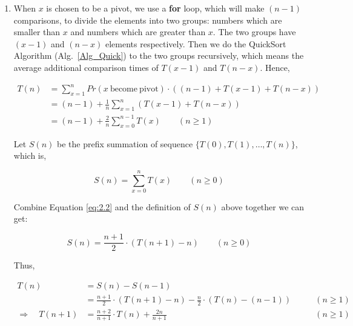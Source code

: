 \documentclass[12pt,a4paper]{article}
\makeatletter
\newtheorem*{solution}{Solution}
\theoremstyle{definition}
\renewenvironment{solution}[1][Solution] {\par\pushQED{\qed}\normalfont\topsep6\p@\@plus6\p@\relax\trivlist\item[\hskip\labelsep\bfseries#1\@addpunct{.}]\ignorespaces}{\popQED\endtrivlist\@endpefalse} \makeatother
\makeatother
\begin{document}
\begin{enumerate}
\begin{solution}
        When $x$ is chosen to be a pivot, we use a \textbf{for} loop, which will make $(n-1)$ comparisons, to divide the elements into two groups: numbers which are smaller than $x$ and numbers which are greater than $x$. The two groups have $(x - 1)$ and $(n - x)$ elements respectively. Then we do the QuickSort Algorithm (Alg.~\ref{Alg_Quick}) to the two groups recursively, which means the average additional comparison times of $T(x-1)$ and $T(n-x)$. Hence,

        \begin{equation}
        \begin{aligned}
            T(n) &= \sum_{x=1}^n Pr(x \mathrm{\ become\ pivot}) \cdot \left((n-1) + T(x-1) + T(n-x)\right) \\
                 &= (n-1) + \frac{1}{n} \sum_{x=1}^n \left(T(x-1) + T(n-x)\right) \\
                 &= (n-1) + \frac{2}{n} \sum_{x=0}^{n-1} T(x) \quad \quad (n \geq 1)
        \end{aligned}
        \label{eq:2.2}
        \end{equation}

        Let $S(n)$ be the prefix summation of sequence $\{T(0), T(1), \dots, T(n)\}$, which is,

        \begin{displaymath}
            S(n) = \sum_{x=0}^{n} T(x) \quad \quad  (n \geq 0)
        \end{displaymath}

        Combine Equation \eqref{eq:2.2} and the definition of $S(n)$ above together we can get:

        \begin{displaymath}
            S(n) = \frac{n+1}{2} \cdot \left(T(n+1) - n\right) \quad \quad (n \geq 0)
        \end{displaymath}

        Thus,

        \begin{equation}
        \begin{aligned}
            T(n) &= S(n) - S(n-1) \\
                 &= \frac{n+1}{2} \cdot \left(T(n+1) - n\right) - \frac{n}{2} \cdot \left(T(n) - (n-1)\right) \quad \quad &(n \geq 1)\\
        \Longrightarrow \quad T(n+1) &= \frac{n+2}{n+1} \cdot T(n) + \frac{2n}{n+1} \quad \quad &(n \geq 1)
        \end{aligned}
        \label{eq:2.3}
        \end{equation}


\end{solution}
\end{enumerate}
\end{document}
